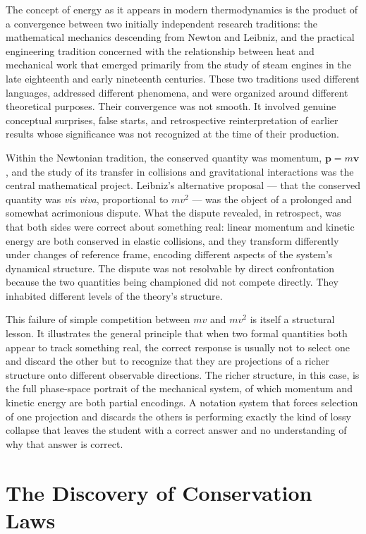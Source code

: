 \documentclass[12pt,openany]{book}
\theoremstyle{plain}
\theoremstyle{definition}
\theoremstyle{remark}
\begin{document}
The concept of energy as it appears in modern thermodynamics is the product of a convergence between two initially independent research traditions: the mathematical mechanics descending from Newton and Leibniz, and the practical engineering tradition concerned with the relationship between heat and mechanical work that emerged primarily from the study of steam engines in the late eighteenth and early nineteenth centuries. These two traditions used different languages, addressed different phenomena, and were organized around different theoretical purposes. Their convergence was not smooth. It involved genuine conceptual surprises, false starts, and retrospective reinterpretation of earlier results whose significance was not recognized at the time of their production.

Within the Newtonian tradition, the conserved quantity was momentum, $\mathbf{p} = m\mathbf{v}$, and the study of its transfer in collisions and gravitational interactions was the central mathematical project. Leibniz's alternative proposal — that the conserved quantity was \emph{vis viva}, proportional to $mv^2$ — was the object of a prolonged and somewhat acrimonious dispute. What the dispute revealed, in retrospect, was that both sides were correct about something real: linear momentum and kinetic energy are both conserved in elastic collisions, and they transform differently under changes of reference frame, encoding different aspects of the system's dynamical structure. The dispute was not resolvable by direct confrontation because the two quantities being championed did not compete directly. They inhabited different levels of the theory's structure.

This failure of simple competition between $mv$ and $mv^2$ is itself a structural lesson. It illustrates the general principle that when two formal quantities both appear to track something real, the correct response is usually not to select one and discard the other but to recognize that they are projections of a richer structure onto different observable directions. The richer structure, in this case, is the full phase-space portrait of the mechanical system, of which momentum and kinetic energy are both partial encodings. A notation system that forces selection of one projection and discards the others is performing exactly the kind of lossy collapse that leaves the student with a correct answer and no understanding of why that answer is correct.

\section{The Discovery of Conservation Laws}
\end{document}

